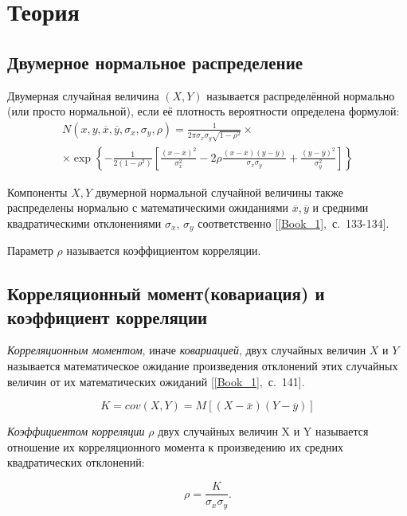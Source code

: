 \documentclass[12pt,a4paper]{article}
\begin{document}
\section{Теория}
	\subsection{Двумерное нормальное распределение}
		Двумерная случайная величина $(X, Y)$ называется распределённой нормально (или просто нормальной), если её плотность вероятности определена формулой:
		\begin{multline}\label{eqn:multivariate_normal}
		N(x, y, \overline{x}, \overline{y}, \sigma_x, \sigma_y, \rho) = \frac{1}{2\pi\sigma_x\sigma_y\sqrt{1 - \rho^2}} \times\\
		\times \exp\left\{
		-\frac{1}{2(1 - \rho^2)} \left[\frac{(x - \overline{x})^2}{\sigma^2_x} - 2\rho\frac{(x - \overline{x})(y - \overline{y})}{\sigma_x \sigma_y} + \frac{(y - \overline{y})^2}{\sigma^2_y}\right]
		\right\}
		\end{multline}
		
		Компоненты $X, Y$ двумерной нормальной случайной величины также распределены нормально с математическими ожиданиями $\overline{x}, \overline{y}$ и средними квадратическими отклонениями $\sigma_x$, $\sigma_y$ соответственно [\ref{Book_1},~с.~133-134].
	
		Параметр $\rho$ называется коэффициентом корреляции.
	
	\subsection{Корреляционный момент(ковариация) и коэффициент корреляции}
		\emph{Корреляционным моментом}, иначе \emph{ковариацией}, двух случайных величин $X$ и $Y$ называется математическое ожидание произведения отклонений этих случайных величин от их математических ожиданий [\ref{Book_1},~с.~141].
	
		\begin{equation}\label{eqn:cor_moment}
		K = cov(X, Y) = M[(X - \overline{x})(Y - \overline{y})]
		\end{equation}
		
		\emph{Коэффициентом корреляции} $\rho$ двух случайных величин X и Y называется отношение их корреляционного момента к произведению их средних квадратических отклонений:
		
		\begin{equation}\label{eqn:cor_coef}
		\rho = \frac{K}{\sigma_x\sigma_y}.
		\end{equation}
		
\end{document}
